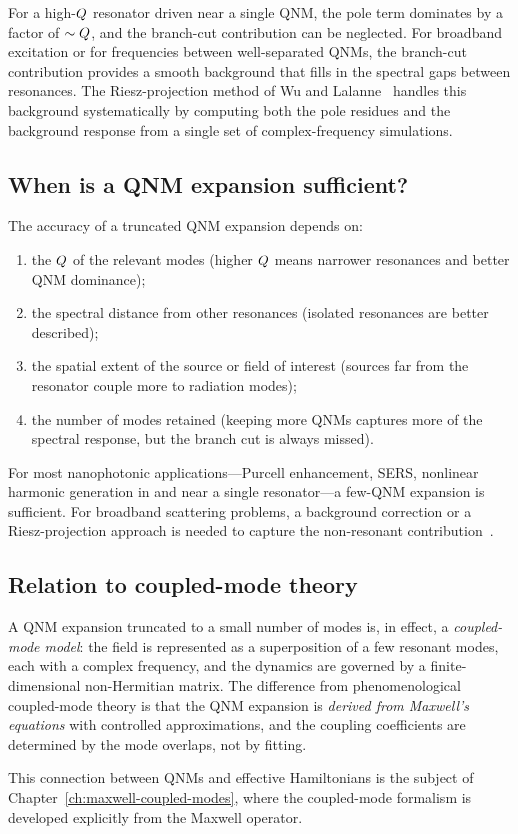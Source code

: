 For a high-$Q$ resonator driven near a single QNM, the pole term
dominates by a factor of $\sim Q$, and the branch-cut contribution
can be neglected. For broadband excitation or for frequencies between
well-separated QNMs, the branch-cut contribution provides a smooth
background that fills in the spectral gaps between resonances. The
Riesz-projection method of Wu and Lalanne~\cite{wu2026rigorous}
handles this background systematically by computing both the pole
residues and the background response from a single set of complex-frequency
simulations.

\subsection{When is a QNM expansion sufficient?}
\label{ssec:qnm-sufficiency}

The accuracy of a truncated QNM expansion depends on:
\begin{enumerate}
 \item the $Q$ of the relevant modes (higher $Q$ means narrower
 resonances and better QNM dominance);
 \item the spectral distance from other resonances (isolated resonances
 are better described);
 \item the spatial extent of the source or field of interest (sources
 far from the resonator couple more to radiation modes);
 \item the number of modes retained (keeping more QNMs captures
 more of the spectral response, but the branch cut is always
 missed).
\end{enumerate}

For most nanophotonic applications---Purcell enhancement, SERS,
nonlinear harmonic generation in and near a single resonator---a few-QNM
expansion is sufficient. For broadband scattering problems, a background
correction or a Riesz-projection approach is needed to capture the
non-resonant contribution~\cite{wu2026rigorous}.

\subsection{Relation to coupled-mode theory}
\label{ssec:qnm-cmt-bridge}

A QNM expansion truncated to a small number of modes is, in effect, a
\emph{coupled-mode model}: the field is represented as a superposition
of a few resonant modes, each with a complex frequency, and the dynamics
are governed by a finite-dimensional non-Hermitian matrix. The
difference from phenomenological coupled-mode theory is that the QNM
expansion is \emph{derived from Maxwell's equations} with controlled
approximations, and the coupling coefficients are determined by the
mode overlaps, not by fitting.

This connection between QNMs and effective Hamiltonians is the subject
of Chapter~\ref{ch:maxwell-coupled-modes}, where the coupled-mode
formalism is developed explicitly from the Maxwell operator.
